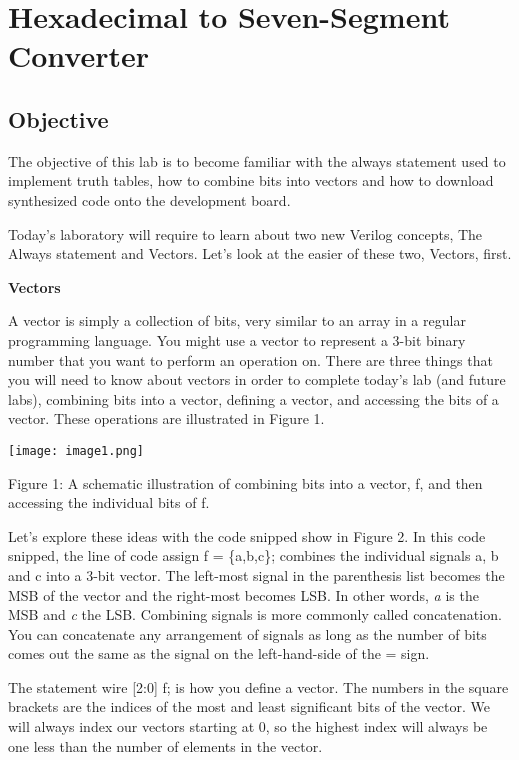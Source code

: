 \chapter{Hexadecimal to Seven-Segment Converter}
\label{HexToSeven}
\graphicspath{ {./Lab02HexToSeven/Fig} }


\hypertarget{objective}{%
\section{\texorpdfstring{Objective }{Objective }}\label{objective}}

The objective of this lab is to become familiar with the always
statement used to implement truth tables, how to combine bits into
vectors and how to download synthesized code onto the development board.

Today's laboratory will require to learn about two new Verilog concepts,
The Always statement and Vectors. Let's look at the easier of these two,
Vectors, first.

\textbf{Vectors}

A vector is simply a collection of bits, very similar to an array in a
regular programming language. You might use a vector to represent a
3-bit binary number that you want to perform an operation on. There are
three things that you will need to know about vectors in order to
complete today's lab (and future labs), combining bits into a vector,
defining a vector, and accessing the bits of a vector. These operations
are illustrated in Figure 1.

\texttt{[image: image1.png]}

Figure 1: A schematic illustration of combining bits into a vector, f,
and then accessing the individual bits of f.

Let's explore these ideas with the code snipped show in Figure 2. In
this code snipped, the line of code assign f = \{a,b,c\}; combines the
individual signals a, b and c into a 3-bit vector. The left-most signal
in the parenthesis list becomes the MSB of the vector and the right-most
becomes LSB. In other words, \emph{a} is the MSB and \emph{c} the LSB.
Combining signals is more commonly called concatenation. You can
concatenate any arrangement of signals as long as the number of bits
comes out the same as the signal on the left-hand-side of the = sign.

The statement wire {[}2:0{]} f; is how you define a vector. The numbers
in the square brackets are the indices of the most and least significant
bits of the vector. We will always index our vectors starting at 0, so
the highest index will always be one less than the number of elements in
the vector.

